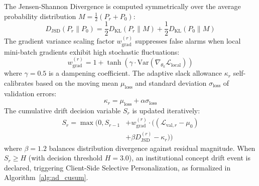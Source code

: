 \documentclass[journal,twocolumn,10pt]{IEEEtran}
\begin{document}
The Jensen-Shannon Divergence is computed symmetrically over the average probability distribution $M = \frac{1}{2}(P_r + P_0)$:
\begin{equation}
D_{\text{JSD}}(P_r \parallel P_0) = \frac{1}{2} D_{\text{KL}}(P_r \parallel M) + \frac{1}{2} D_{\text{KL}}(P_0 \parallel M)
\end{equation}
The gradient variance scaling factor $w_{\text{grad}}^{(r)}$ suppresses false alarms when local mini-batch gradients exhibit high stochastic fluctuations:
\begin{equation}
w_{\text{grad}}^{(r)} = 1 + \tanh\left(\gamma \cdot \text{Var}\left(\nabla_{\theta_k} \mathcal{L}_{\text{local}}\right)\right)
\end{equation}
where $\gamma = 0.5$ is a dampening coefficient. The adaptive slack allowance $\kappa_r$ self-calibrates based on the moving mean $\mu_{\text{loss}}$ and standard deviation $\sigma_{\text{loss}}$ of validation errors:
\begin{equation}
\kappa_r = \mu_{\text{loss}} + \alpha \sigma_{\text{loss}}
\end{equation}
The cumulative drift decision variable $S_r$ is updated iteratively:
\begin{equation}
\begin{aligned}
S_r = \max\Big(0, S_{r-1} &+ w_{\text{grad}}^{(r)} \cdot \big((\mathcal{L}_{\text{val}, r} - \mu_0) \\
&+ \beta D_{\text{JSD}}^{(r)} - \kappa_r\big)\Big)
\end{aligned}
\end{equation}
where $\beta = 1.2$ balances distribution divergence against residual magnitude. When $S_r \ge H$ (with decision threshold $H = 3.0$), an institutional concept drift event is declared, triggering Client-Side Selective Personalization, as formalized in Algorithm~\ref{alg:ad_cusum}.
\end{document}

